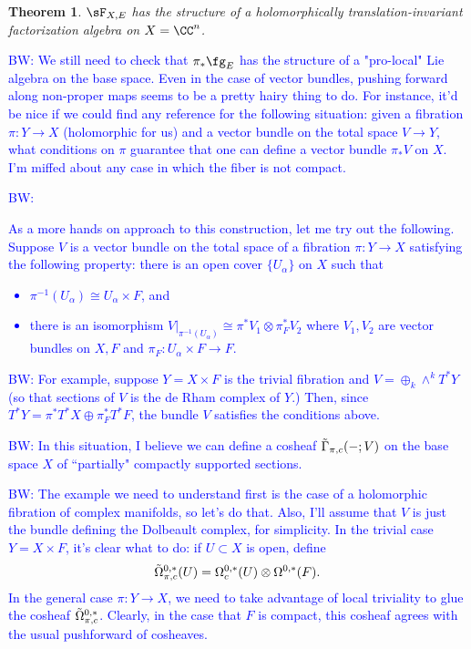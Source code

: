 \documentclass[12pt]{amsart}
\newtheorem{theorem}{Theorem}[section]
\theoremstyle{definition}
\theoremstyle{remark}
\def\tensor{\otimes}
\def\brian{\textcolor{blue}{BW: }\textcolor{blue}}
\begin{document}
\begin{theorem}
$\sF_{X,E}$ has the structure of a holomorphically translation-invariant factorization algebra on $X=\CC^n$. 
\end{theorem}

\brian{We still need to check that $\pi_* \fg_E$ has the structure of a "pro-local" Lie algebra on the base space. 
Even in the case of vector bundles, pushing forward along non-proper maps seems to be a pretty hairy thing to do.
For instance, it'd be nice if we could find any reference for the following situation: given a fibration $\pi : Y \to X$ (holomorphic for us) and a vector bundle on the total space $V \to Y$, what conditions on $\pi$ guarantee that one can define a vector bundle $\pi_* V$ on $X$. 
I'm miffed about any case in which the fiber is not compact. 
}

\brian{
As a more hands on approach to this construction, let me try out the following. 
Suppose $V$ is a vector bundle on the total space of a fibration $\pi : Y \to X$ satisfying the following property: there is an open cover $\{U_\alpha\}$ on $X$ such that 
\begin{itemize}
\item $\pi^{-1}(U_\alpha) \cong U_\alpha \times F$, and
\item there is an isomorphism $V|_{\pi^{-1}(U_\alpha)} \cong \pi^*V_1 \tensor \pi_F^*V_2$ where $V_1,V_2$ are vector bundles on $X,F$ and $\pi_F : U_\alpha \times F \to F$.
\end{itemize}
}

\brian{
For example, suppose $Y = X \times F$ is the trivial fibration and $V = \oplus_k \wedge^k T^*Y$ (so that sections of $V$ is the de Rham complex of $Y$.)
Then, since $T^*Y = \pi^* T^*X \oplus \pi_F^* T^*F$, the bundle $V$ satisfies the conditions above. 
}

\brian{In this situation, I believe we can define a cosheaf $\Tilde{\Gamma}_{\pi, c}(-;V)$ on the base space $X$ of ``partially" compactly supported sections.}

\brian{The example we need to understand first is the case of a holomorphic fibration of complex manifolds, so let's do that.
Also, I'll assume that $V$ is just the bundle defining the Dolbeault complex, for simplicity.
In the trivial case $Y = X \times F$, it's clear what to do: if $U \subset X$ is open, define
\[
\Tilde{\Omega}^{0,*}_{\pi,c} (U) = \Omega^{0,*}_c(U) \tensor \Omega^{0,*}(F) .
\]
In the general case $\pi : Y \to X$, we need to take advantage of local triviality to glue the cosheaf $\Tilde{\Omega}^{0,*}_{\pi, c}$. 
Clearly, in the case that $F$ is compact, this cosheaf agrees with the usual pushforward of cosheaves.
}
\end{document}

